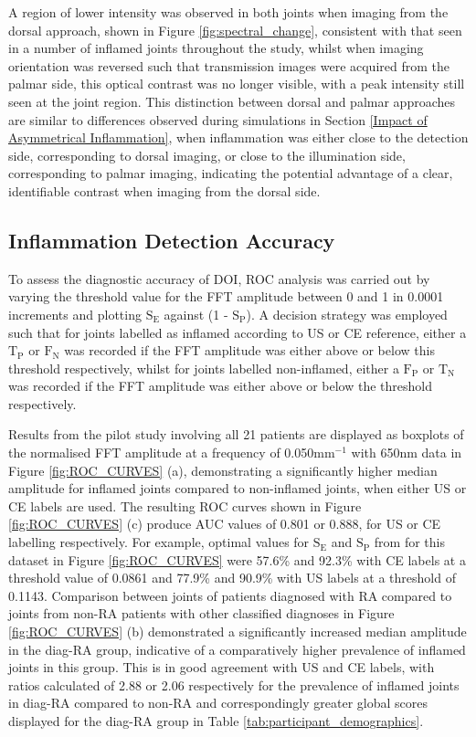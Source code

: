 \documentclass[twoside]{bhamthesis}
\theoremstyle{definition}
\begin{document}
A region of lower intensity was observed in both joints when imaging from the dorsal approach, shown in  Figure \ref{fig:spectral_change}, consistent with that seen in a number of inflamed joints throughout the study, whilst when imaging orientation was reversed such that transmission images were acquired from the palmar side, this optical contrast was no longer visible, with a peak intensity still seen at the joint region. This distinction between dorsal and palmar approaches are similar to differences observed during simulations in Section \ref{Impact of Asymmetrical Inflammation}, when inflammation was either close to the detection side, corresponding to dorsal imaging, or close to the illumination side, corresponding to palmar imaging, indicating the potential advantage of a clear, identifiable contrast when imaging from the dorsal side. 

\subsection{Inflammation Detection Accuracy}

To assess the diagnostic accuracy of DOI, ROC analysis was carried out by varying the threshold value for the FFT amplitude between 0 and 1 in 0.0001 increments and plotting $\mathrm{S_E}$ against (1 - $\mathrm{S_P}$). A decision strategy was employed such that for joints labelled as inflamed according to US or CE reference, either a $\mathrm{T_P}$ or $\mathrm{F_N}$ was recorded if the FFT amplitude was either above or below this threshold respectively, whilst for joints labelled non-inflamed, either a $\mathrm{F_P}$ or $\mathrm{T_N}$ was recorded if the FFT amplitude was either above or below the threshold respectively.

Results from the pilot study involving all 21 patients are displayed as boxplots of the normalised FFT amplitude at a frequency of 0.050mm$^{-1}$ with 650nm data in Figure \ref{fig:ROC_CURVES} (a), demonstrating a significantly higher median amplitude for inflamed joints compared to non-inflamed joints, when either US or CE labels are used. The resulting ROC curves shown in Figure \ref{fig:ROC_CURVES} (c) produce AUC values of  0.801 or 0.888, for US or CE labelling respectively. For example, optimal values for $\mathrm{S_E}$ and $\mathrm{S_P}$ from for this dataset in Figure \ref{fig:ROC_CURVES} were 57.6\% and 92.3\% with CE labels at a threshold value of 0.0861 and 77.9\% and 90.9\% with US labels at a threshold of 0.1143. Comparison between joints of patients diagnosed with RA compared to joints from non-RA patients with other classified diagnoses in Figure \ref{fig:ROC_CURVES} (b) demonstrated a significantly increased median amplitude in the diag-RA group, indicative of a comparatively higher prevalence of inflamed joints in this group. This is in good agreement with US and CE labels, with ratios calculated of 2.88 or 2.06 respectively for the prevalence of inflamed joints in diag-RA compared to non-RA and correspondingly greater global scores displayed for the diag-RA group in Table 
\ref{tab:participant_demographics}.
\end{document}
